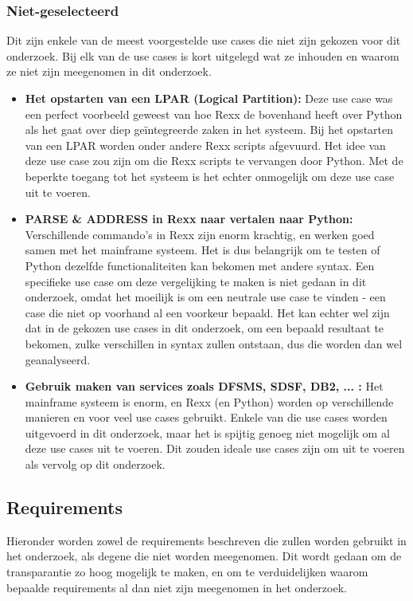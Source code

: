 \subsubsection{Niet-geselecteerd}
Dit zijn enkele van de meest voorgestelde use cases die niet zijn gekozen voor dit onderzoek. Bij elk van de use cases is kort uitgelegd wat ze inhouden en waarom ze niet zijn meegenomen in dit onderzoek.
\begin{itemize}
    \item \textbf{Het opstarten van een LPAR (Logical Partition):} Deze use case was een perfect voorbeeld geweest van hoe Rexx de bovenhand heeft over Python als het gaat over diep geïntegreerde zaken in het systeem. Bij het opstarten van een LPAR worden onder andere Rexx scripts afgevuurd. Het idee van deze use case zou zijn om die Rexx scripts te vervangen door Python. Met de beperkte toegang tot het systeem is het echter onmogelijk om deze use case uit te voeren.
    \item \textbf{PARSE \& ADDRESS in Rexx naar vertalen naar Python:} Verschillende commando's in Rexx zijn enorm krachtig, en werken goed samen met het mainframe systeem. Het is dus belangrijk om te testen of Python dezelfde functionaliteiten kan bekomen met andere syntax. Een specifieke use case om deze vergelijking te maken is niet gedaan in dit onderzoek, omdat het moeilijk is om een neutrale use case te vinden - een case die niet op voorhand al een voorkeur bepaald. Het kan echter wel zijn dat in de gekozen use cases in dit onderzoek, om een bepaald resultaat te bekomen, zulke verschillen in syntax zullen ontstaan, dus die worden dan wel geanalyseerd.
    \item \textbf{Gebruik maken van services zoals DFSMS, SDSF, DB2, ... :} Het mainframe systeem is enorm, en Rexx (en Python) worden op verschillende manieren en voor veel use cases gebruikt. Enkele van die use cases worden uitgevoerd in dit onderzoek, maar het is spijtig genoeg niet mogelijk om al deze use cases uit te voeren. Dit zouden ideale use cases zijn om uit te voeren als vervolg op dit onderzoek.
\end{itemize}

\subsection{Requirements}
Hieronder worden zowel de requirements beschreven die zullen worden gebruikt in het onderzoek, als degene die niet worden meegenomen. Dit wordt gedaan om de transparantie zo hoog mogelijk te maken, en om te verduidelijken waarom bepaalde requirements al dan niet zijn meegenomen in het onderzoek.


